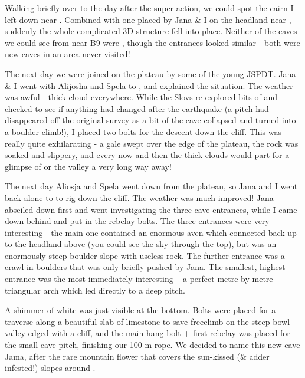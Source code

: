 
Walking briefly over to  the day after the super-action, we could spot
the cairn I left down near . Combined with one placed by
Jana \& I on the headland near , suddenly the whole complicated 3D
structure fell into place. Neither of the caves we could see from near
B9 were , though the entrances looked similar - both
were new caves in an area never visited!

The next day we were joined on the plateau by some of the young JSPDT.
Jana \& I went with Alijosha and Spela to , and explained the
situation. The weather was awful - thick cloud everywhere. While the
Slovs re-explored bits of  and checked to see if anything had changed
after the earthquake (a pitch had disappeared off the original survey as
a bit of the cave collapsed and turned into a boulder climb!), I placed
two bolts for the descent down the cliff. This was really quite
exhilarating - a gale swept over the edge of the plateau, the rock was
soaked and slippery, and every now and then the thick clouds would part
for a glimpse of  or the  valley a very long way away!

The next day Aliosja and Spela went down from the plateau, so Jana and I
went back alone to  to rig down the cliff. The weather was much
improved! Jana abseiled down first and went investigating the three cave
entrances, while I came down behind and put in the rebelay bolts. The
three entrances were very interesting - the main one contained an
enormous aven which connected back up to the headland above  (you
could see the sky through the top), but was an enormously steep boulder
slope with useless rock. The further entrance was a crawl in boulders
that was only briefly pushed by Jana. The smallest, highest entrance was
the most immediately interesting -- a perfect metre by metre triangular
arch which led directly to a deep pitch. 

A shimmer of white was just
visible at the bottom. Bolts were placed for a traverse along a
beautiful slab of limestone to save freeclimb on the steep bowl valley
edged with a cliff, and the main hang bolt + first rebelay was placed
for the small-cave pitch, finishing our 100 m rope. We decided to name
this new cave  Jama, after the rare mountain flower that covers
the sun-kissed (\& adder infested!) slopes around .

